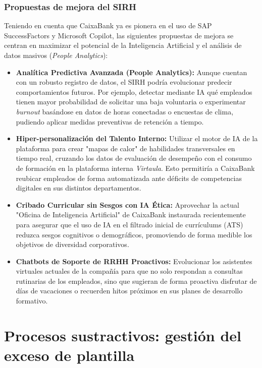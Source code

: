 \subsubsection{Propuestas de mejora del SIRH}

Teniendo en cuenta que CaixaBank ya es pionera en el uso de SAP SuccessFactors y Microsoft Copilot, las siguientes propuestas de mejora se centran en maximizar el potencial de la Inteligencia Artificial y el análisis de datos masivos (\textit{People Analytics}):

\begin{itemize}
  \item \textbf{Analítica Predictiva Avanzada (People Analytics):} Aunque cuentan con un robusto registro de datos, el SIRH podría evolucionar predecir comportamientos futuros. Por ejemplo, detectar mediante IA qué empleados tienen mayor probabilidad de solicitar una baja voluntaria o experimentar \textit{burnout} basándose en datos de horas conectadas o encuestas de clima, pudiendo aplicar medidas preventivas de retención a tiempo.
  \item \textbf{Hiper-personalización del Talento Interno:} Utilizar el motor de IA de la plataforma para crear "mapas de calor" de habilidades transversales en tiempo real, cruzando los datos de evaluación de desempeño con el consumo de formación en la plataforma interna \textit{Virtaula}. Esto permitiría a CaixaBank reubicar empleados de forma automatizada ante déficits de competencias digitales en sus distintos departamentos.
  \item \textbf{Cribado Curricular sin Sesgos con IA Ética:} Aprovechar la actual "Oficina de Inteligencia Artificial" de CaixaBank instaurada recientemente para asegurar que el uso de IA en el filtrado inicial de currículums (ATS) reduzca sesgos cognitivos o demográficos, promoviendo de forma medible los objetivos de diversidad corporativos.
  \item \textbf{Chatbots de Soporte de RRHH Proactivos:} Evolucionar los asistentes virtuales actuales de la compañía para que no solo respondan a consultas rutinarias de los empleados, sino que sugieran de forma proactiva disfrutar de días de vacaciones o recuerden hitos próximos en sus planes de desarrollo formativo.
\end{itemize}



\section{Procesos sustractivos: gestión del exceso de plantilla}

